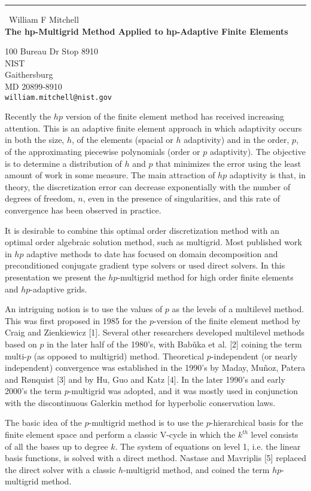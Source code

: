 \documentclass{report}
\begin{document}
\begin{center}
\rule{6in}{1pt} \
{\large William F Mitchell \\
{\bf The hp-Multigrid Method Applied to hp-Adaptive Finite Elements}}

100 Bureau Dr Stop 8910 \\ NIST \\ Gaithersburg \\ MD 20899-8910
\\
{\tt william.mitchell@nist.gov}\end{center}

Recently the $hp$ version of the finite element method has received
increasing attention. This is an adaptive finite element approach in
which adaptivity occurs in both the size, $h$, of the elements (spacial
or $h$ adaptivity) and in the order, $p$, of the approximating piecewise
polynomials (order or $p$ adaptivity). The objective is to determine a
distribution of $h$ and $p$ that minimizes the error using the least
amount of work in some measure. The main attraction of $hp$ adaptivity is
that, in theory, the discretization error can decrease exponentially with
the number of degrees of freedom, $n$, even in the presence of
singularities, and this rate of convergence has been observed in
practice.

It is desirable to combine this optimal order discretization method with
an optimal order algebraic solution method, such as multigrid. Most
published work in $hp$ adaptive methods to date has focused on domain
decomposition and preconditioned conjugate gradient type solvers or used
direct solvers. In this presentation we present the $hp$-multigrid method
for high order finite elements and $hp$-adaptive grids.

An intriguing notion is to use the values of $p$ as the levels of a
multilevel method. This was first proposed in 1985 for the $p$-version of
the finite element method by Craig and Zienkiewicz [1]. Several other
researchers developed multilevel methods based on $p$ in the later half
of the 1980's, with Bab{\v{u}}ka et al. [2] coining the term multi-$p$
(as opposed to multigrid) method. Theoretical $p$-independent (or nearly
independent) convergence was established in the 1990's by Maday,
Mu{\~{n}}oz, Patera and R{\o}nquist [3] and by Hu, Guo and Katz [4]. In
the later 1990's and early 2000's the term $p$-multigrid was adopted, and
it was mostly used in conjunction with the discontinuous Galerkin method
for hyperbolic conservation laws.

The basic idea of the $p$-multigrid method is to use the $p$-hierarchical
basis for the finite element space and perform a classic V-cycle in which
the $k^{th}$ level consists of all the bases up to degree $k$. The system
of equations on level 1, i.e. the linear basis functions, is solved with
a direct method. Nastase and Mavriplis [5] replaced the direct solver
with a classic $h$-multigrid method, and coined the term $hp$-multigrid
method.
\end{document}
